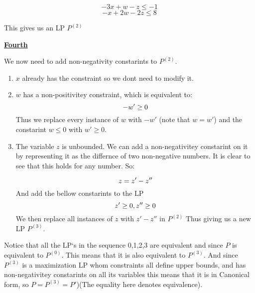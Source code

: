 \documentclass{article}
\numberwithin{equation}{subsection}
\begin{document}
	\begin{equation}\tag{1.1}
		-3x+w-z \leq -1
	\end{equation}
	\begin{equation}\tag{3.2.1}
		-x+2w-2z \leq 8
	\end{equation}

	\par{This gives us an LP $P^{(2)}$}

	
	\vspace{15pt}
	\textbf{\underline{Fourth}}
	\par{
		We now need to add non-negativity constarints to $P^{(2)}$.
	}

	\begin{enumerate}
		\item $x$ already has the constraint so we dont need to modify it.
		\item \par{
			$w$ has a non-positivitey constraint, which is equivalent to:
			\begin{equation}\notag
				-w' \ge 0
			\end{equation}
			Thus we replace every instance of $w$ with $-w'$ (note that $w=w'$)
			and the constarint $w\leq 0$ with $w'\ge 0$.
		}

		\item \par{
				The variable $z$ is unbounded. We can add a non-negativitey constarint
				on it by representing it as the differnce of two non-negative numbers.
				It is clear to see that this holds for any number. So:

				\begin{equation}\notag
					z = z' - z''	
				\end{equation}
				And add the bellow constarints to the LP
				\begin{equation}\notag
					z'\ge0, z''\ge0
				\end{equation}
				We then replace all instances of $z$ with $z'-z''$ in $P^{(2)}$ Thus giving us a new LP $P^{(3)}$.
			}
	\end{enumerate}
	
	Notice that all the LP`s in the sequence {0,1,2,3} are equivalent and since $P$ is equivalent to $P^{(0)}$.
	This means that it is also equivalent to $P^{(3)}$. And since $P^{(3)}$ is a maximization 
	LP whom constraints all define upper bounds, and has non-negativitey constarints 
	on all its variables this means that it is in Canonical form, so $P=P^{(3)} = P'$)(The equality
	here denotes equivalence).
\end{document}
